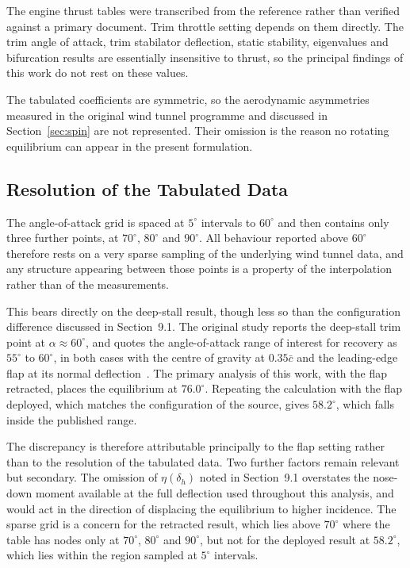 \documentclass[
bindingoffset=5mm,  %
footnoteindent=3mm, %
hyphenation=true    %
]{src/wut-thesis}
\begin{document}
 
 The engine thrust tables were transcribed from the reference rather than
 verified against a primary document. Trim throttle setting depends on them
 directly. The trim angle of attack, trim stabilator deflection, static
 stability, eigenvalues and bifurcation results are essentially insensitive to
 thrust, so the principal findings of this work do not rest on these values.
 
 The tabulated coefficients are symmetric, so the aerodynamic asymmetries measured in the original wind tunnel programme and discussed in Section~\ref{sec:spin} are not represented. Their omission is the reason no rotating equilibrium can appear in the present formulation.
 
 \subsection{Resolution of the Tabulated Data}
 
 The angle-of-attack grid is spaced at $5^{\circ}$ intervals to $60^{\circ}$
 and then contains only three further points, at $70^{\circ}$, $80^{\circ}$ and
 $90^{\circ}$. All behaviour reported above $60^{\circ}$ therefore rests on a
 very sparse sampling of the underlying wind tunnel data, and any structure
 appearing between those points is a property of the interpolation rather than
 of the measurements.
 
 
 
 This bears directly on the deep-stall result, though less so than the
 configuration difference discussed in Section~9.1. The original study reports
 the deep-stall trim point at $\alpha \approx 60^{\circ}$, and quotes the
 angle-of-attack range of interest for recovery as $55^{\circ}$ to
 $60^{\circ}$, in both cases with the centre of gravity at $0.35\bar{c}$ and
 the leading-edge flap at its normal deflection~\cite{nguyen1979}. The primary
 analysis of this work, with the flap retracted, places the equilibrium at
 $76.0^{\circ}$. Repeating the calculation with the flap deployed, which
 matches the configuration of the source, gives $58.2^{\circ}$, which falls
 inside the published range.
 
 The discrepancy is therefore attributable principally to the flap setting
 rather than to the resolution of the tabulated data. Two further factors
 remain relevant but secondary. The omission of $\eta(\delta_{h})$ noted in
 Section~9.1 overstates the nose-down moment available at the full deflection
 used throughout this analysis, and would act in the direction of displacing
 the equilibrium to higher incidence. The sparse grid is a concern for the
 retracted result, which lies above $70^{\circ}$ where the table has nodes only
 at $70^{\circ}$, $80^{\circ}$ and $90^{\circ}$, but not for the deployed
 result at $58.2^{\circ}$, which lies within the region sampled at $5^{\circ}$
 intervals.
 
\end{document}
